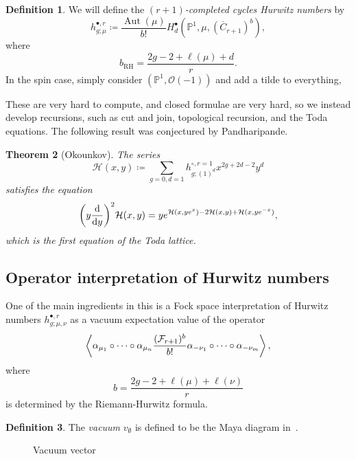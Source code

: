 \documentclass[leqno, openany]{memoir}
\newtheorem{thm}{Theorem}[section]
\theoremstyle{definition}
\newtheorem{defn}[thm]{Definition}
\theoremstyle{remark}
\theoremstyle{plain}
\theoremstyle{definition}
\theoremstyle{remark}
\renewcommand{\P}{\mathbb{P}}
\newcommand{\mc}[1]{\mathcal{#1}}
\newcommand{\mr}[1]{\mathrm{#1}}
\newcommand{\ol}[1]{\overline{#1}}
\DeclareMathOperator{\Aut}{Aut}
\begin{document}
\begin{defn}
  We will define the \textit{$(r+1)$-completed cycles Hurwitz numbers} by
  \[ h_{g;\mu}^{\bullet, r} \coloneqq \frac{\Aut(\mu)}{b!} H_d^{\bullet}(\P^1, \mu, (\ol{C}_{r+1})^b), \]
  where
  \[ b_{\mr{RH}} = \frac{2g-2+\ell(\mu)+d}{r}. \]
  In the spin case, simply consider $(\P^1, \mc{O}(-1))$ and add a tilde to everything,
\end{defn}

These are very hard to compute, and closed formulae are very hard, so we instead develop recursions, such as cut and join, topological recursion, and the Toda equations. The following result was conjectured by Pandharipande.

\begin{thm}[Okounkov]
  The series
  \[ \mc{H}(x,y) \coloneqq \sum_{g=0,d=1} h_{g;(1)^d}^{\circ,r=1} x^{2g+2d-2}y^d \]
  satisfies the equation
  \[ \qty(y \dv{y})^2 \mc{H}(x,y) = ye^{\mc{H}(x,ye^x)-2\mc{H}(x,y) + \mc{H}(x,ye^{-x})}, \]
  which is the first equation of the Toda lattice.
\end{thm}

\subsection{Operator interpretation of Hurwitz numbers}
\label{subsec:fockspace}

One of the main ingredients in this is a Fock space interpretation of Hurwitz numbers $h_{g;\mu,\nu}^{\bullet,r}$ as a vacuum expectation value of the operator
\[ \ev{\alpha_{\mu_1} \circ \cdots \circ \alpha_{\mu_n} \frac{(\mc{F}_{r+1})^b}{b!} \alpha_{-\nu_1} \circ \cdots \circ \alpha_{-\nu_m}}, \]
where
\[ b = \frac{2g-2+\ell(\mu) + \ell(\nu)}{r} \]
is determined by the Riemann-Hurwitz formula.

\begin{defn}
  The \textit{vacuum} $v_{\emptyset}$ is defined to be the Maya diagram in~.
  \begin{figure}[htpb]
    \centering
    \caption{Vacuum vector}
    \label{fig:vacuum}
  \end{figure}
\end{defn}
\end{document}
